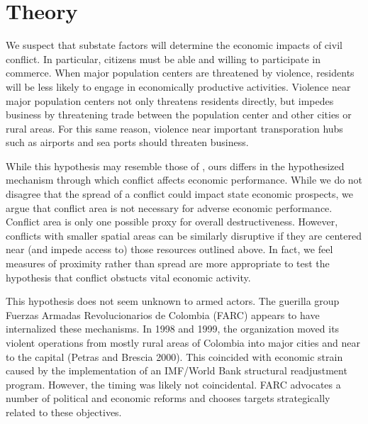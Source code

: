 \section{Theory}
\label{theory}


We suspect that substate factors will determine the economic impacts of civil conflict.  In particular, citizens must be able and willing to participate in commerce.  When major population centers are threatened by violence, residents will be less likely to engage in economically productive activities.  Violence near major population centers not only threatens residents directly, but impedes business by threatening trade between the population center and other cities or rural areas.  For this same reason, violence near important transporation hubs such as airports and sea ports should threaten business.

While this hypothesis may resemble those of \cite{imai:weinstein:2000}, ours differs in the hypothesized mechanism through which conflict affects economic performance.  While we do not disagree that the spread of a conflict could impact state economic prospects, we argue that conflict area is not necessary for adverse economic performance.  Conflict area is only one possible proxy for overall destructiveness.  However, conflicts with smaller spatial areas can be similarly disruptive if they are centered near (and impede access to) those resources outlined above.  In fact, we feel measures of proximity rather than spread are more appropriate to test the hypothesis that conflict obstucts vital economic activity.

This hypothesis does not seem unknown to armed actors.  The guerilla group Fuerzas Armadas Revolucionarios de Colombia (FARC) appears to have internalized these mechanisms.  In 1998 and 1999, the organization moved its violent operations from mostly rural areas of Colombia into major cities and near to the capital (Petras and Brescia 2000).  This coincided with economic strain caused by the implementation of an IMF/World Bank structural readjustment program.  However, the timing was likely not coincidental.  FARC advocates a number of political and economic reforms and chooses targets strategically related to these objectives.

